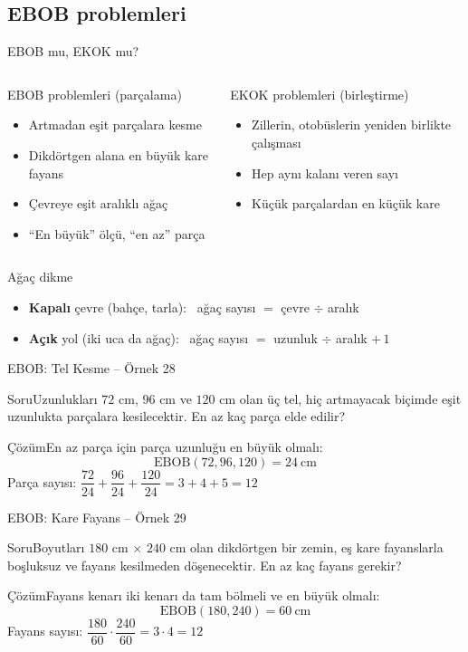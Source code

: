 \documentclass[aspectratio=169,11pt]{beamer}
\newcommand{\soru}[3]{%
\begin{frame}{#1}
  \begin{block}{Soru}\large #2\end{block}
  \pause
  \begin{exampleblock}{Çözüm}\large #3\end{exampleblock}
\end{frame}}
\begin{document}
\subsection{EBOB problemleri}
\begin{frame}{EBOB mu, EKOK mu?}
\begin{columns}[t]
\begin{block}{EBOB problemleri (parçalama)}
\begin{itemize}
\item Artmadan eşit parçalara kesme
\item Dikdörtgen alana en büyük kare fayans
\item Çevreye eşit aralıklı ağaç
\item ``En büyük'' ölçü, ``en az'' parça
\end{itemize}
\end{block}
\begin{block}{EKOK problemleri (birleştirme)}
\begin{itemize}
\item Zillerin, otobüslerin yeniden birlikte çalışması
\item Hep aynı kalanı veren sayı
\item Küçük parçalardan en küçük kare
\end{itemize}
\end{block}
\end{columns}
\begin{alertblock}{Ağaç dikme}
\begin{itemize}
\item \textbf{Kapalı} çevre (bahçe, tarla): \ ağaç sayısı \(=\) çevre \(\div\) aralık
\item \textbf{Açık} yol (iki uca da ağaç): \ ağaç sayısı \(=\) uzunluk \(\div\) aralık \(+\,1\)
\end{itemize}
\end{alertblock}
\end{frame}

\soru{EBOB: Tel Kesme -- Örnek 28}
{Uzunlukları \(72\) cm, \(96\) cm ve \(120\) cm olan üç tel, hiç artmayacak biçimde eşit uzunlukta parçalara kesilecektir. En az kaç parça elde edilir?}
{En az parça için parça uzunluğu en büyük olmalı:
\[\text{EBOB}(72,96,120)=24\ \text{cm}\]
Parça sayısı: \(\dfrac{72}{24}+\dfrac{96}{24}+\dfrac{120}{24}=3+4+5=12\)}

\soru{EBOB: Kare Fayans -- Örnek 29}
{Boyutları \(180\) cm \(\times\) \(240\) cm olan dikdörtgen bir zemin, eş kare fayanslarla boşluksuz ve fayans kesilmeden döşenecektir. En az kaç fayans gerekir?}
{Fayans kenarı iki kenarı da tam bölmeli ve en büyük olmalı:
\[\text{EBOB}(180,240)=60\ \text{cm}\]
Fayans sayısı: \(\dfrac{180}{60}\cdot\dfrac{240}{60}=3\cdot 4=12\)}
\end{document}
